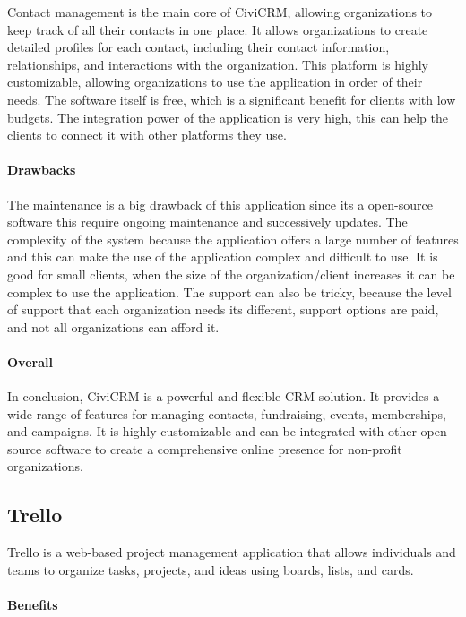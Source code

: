 \documentclass{article}
\begin{document}
Contact management is the main core of CiviCRM, allowing organizations to keep track of all their contacts in one place. It allows organizations to create detailed profiles for each contact, including their contact information, relationships, and interactions with the organization. This platform is highly customizable, allowing organizations to use the application in order of their needs. The software itself is free, which is a significant benefit for clients with low budgets. The integration power of the application is very high, this can help the clients to connect it with other platforms they use.

\paragraph{Drawbacks}

The maintenance is a big drawback of this application since its a open-source software this require ongoing maintenance and successively updates. The complexity of the system because the application offers a large number of features and this can make the use of the application complex and difficult to use. It is good for small clients, when the size of the organization/client increases it can be complex to use the application. The support can also be tricky, because the level of support that each organization needs its different, support options are paid, and not all organizations can afford it.

\paragraph{Overall}

 In conclusion, CiviCRM is a powerful and flexible CRM solution. It provides a wide range of features for managing contacts, fundraising, events, memberships, and campaigns. It is highly customizable and can be integrated with other open-source software to create a comprehensive online presence for non-profit organizations.

\subsection{Trello}

Trello is a web-based project management application that allows individuals and teams to organize tasks, projects, and ideas using boards, lists, and cards.

\paragraph{Benefits}
\end{document}
